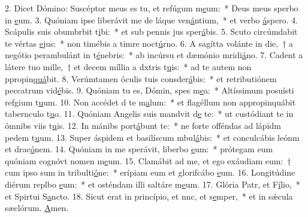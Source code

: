 2. Dicet Dómino: Suscéptor meus es tu, et refúgum m\uline{e}um:~* Deus meus sperbo in \uline{e}um.
3. Quóniam ipse liberávit me de láque ven\uline{á}ntium,~* et  verbo \uline{á}spero.
4. Scápulis suis obumbrbit t\uline{i}bi:~* et sub pennis jus sper\uline{á}bis.
5. Scuto circúmdabit te vértas \uline{e}jus:~* non timébis a timre noct\uline{ú}rno.
6. A sagítta volánte in die,~† a negótio perambulánt in t\uline{é}nebris:~* ab incúrsu et dæmónio mridi\uline{á}no.
7. Cadent a látere tuo mille,~† et decem míllia a dxtris t\uline{u}is:~* ad te autem non ppropin\uline{quá}bit.
8. Verúmtamen óculis tuis consder\uline{á}bis:~* et retributiónem peccatrum vid\uline{é}bis.
9. Quóniam tu es, Dómin, spes m\uline{e}a:~* Altíssimum posuísti refgium t\uline{u}um.
10. Non accédet d te m\uline{a}lum:~* et flagéllum non appropinquábit tabernculo t\uline{u}o.
11. Quóniam Angelis suis mandvit d\uline{e} te:~* ut custódiant te in ómnibs viis t\uline{u}is.
12. In mánibs port\uline{á}bunt te:~* ne forte offéndas ad lápidm pedem t\uline{u}um.
13. Super áspidem et basilíscum mbul\uline{á}bis:~* et conculcábis leónm et drac\uline{ó}nem.
14. Quóniam in me sperávit, liberbo \uline{e}um:~* prótegam eum quóniam cognóvt nomen m\uline{e}um.
15. Clamábit ad me, et ego exáudiam eum:~† cum ipso sum in tribulti\uline{ó}ne:~* erípiam eum et glorifcábo \uline{e}um.
16. Longitúdine diérum replbo \uline{e}um:~* et osténdam illi saltáre m\uline{e}um.
17. Glória Patr, et F\uline{í}lio,~* et Spirtui S\uline{a}ncto.
18. Sicut erat in princípio, et nnc, et s\uline{e}mper,~* et in sǽcula sæclórum. \uline{A}men.
